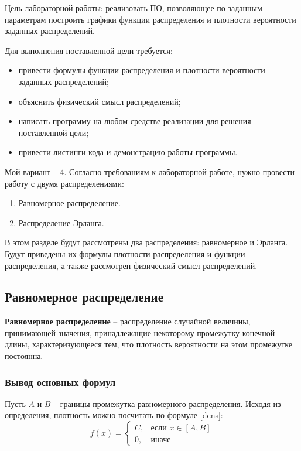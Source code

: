 Цель лабораторной работы: реализовать ПО, позволяющее по заданным параметрам построить графики функции распределения и плотности вероятности заданных распределений.

Для выполнения поставленной цели требуется:
\begin{itemize}
	\item привести формулы функции распределения и плотности вероятности заданных распределений;
	\item объяснить физический смысл распределений;
	\item написать программу на любом средстве реализации для решения поставленной цели;
	\item привести листинги кода и демонстрацию работы программы.
\end{itemize}

Мой вариант -- 4.
Согласно требованиям к лабораторной работе, нужно провести работу с двумя распределениями:
\begin{enumerate}
	\item Равномерное распределение.
	\item Распределение Эрланга.
\end{enumerate}

В этом разделе будут рассмотрены два распределения: равномерное и Эрланга. Будут приведены их формулы плотности распределения и функции распределения, а также рассмотрен физический смысл распределений.

\subsection*{Равномерное распределение}
\textbf{Равномерное распределение} -- распределение случайной величины, принимающей значения, принадлежащие некоторому промежутку конечной длины, характеризующееся тем, что плотность вероятности на этом промежутке постоянна.


\subsubsection*{Вывод основных формул}
Пусть $A$ и $B$ -- границы промежутка равномерного распределения. Исходя из определения, плотность можно посчитать по формуле \ref{dens}:
\begin{equation}
	\label{dens}
	f(x)= 
	\begin{cases}
		C,& \text{если } x \in [A, B]\\
		0,              & \text{иначе}
	\end{cases}
\end{equation}

